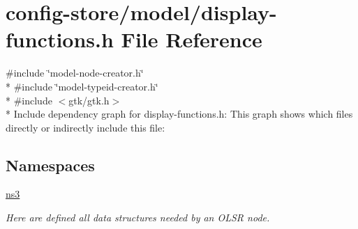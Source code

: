 \hypertarget{display-functions_8h}{}\section{config-\/store/model/display-\/functions.h File Reference}
\label{display-functions_8h}
{\ttfamily \#include \char`\"{}model-\/node-\/creator.\+h\char`\"{}}\\*
{\ttfamily \#include \char`\"{}model-\/typeid-\/creator.\+h\char`\"{}}\\*
{\ttfamily \#include $<$gtk/gtk.\+h$>$}\\*
Include dependency graph for display-\/functions.h\+:
This graph shows which files directly or indirectly include this file\+:
\subsection*{Namespaces}
\begin{DoxyCompactItemize}
\item 
 \hyperlink{namespacens3}{ns3}
\begin{DoxyCompactList}\small\item\em Here are defined all data structures needed by an O\+L\+SR node. \end{DoxyCompactList}\end{DoxyCompactItemize}
